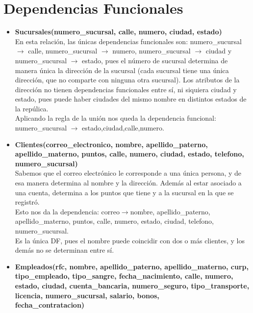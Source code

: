 \documentclass[11pt]{article}
\begin{document}
\section*{Dependencias Funcionales}
\begin{itemize}

\item \textbf{Sucursales(numero\_sucursal, calle, numero, ciudad, estado)}\\
En esta relación, las únicas dependencias funcionales son:
numero\_sucursal $\rightarrow$ calle, numero\_sucursal $\rightarrow$ numero, numero\_sucursal $\rightarrow$ ciudad y  numero\_sucursal $\rightarrow$ estado, pues el número de sucursal determina de manera única la dirección de la sucursal (cada sucursal tiene una única dirección, que no comparte con ninguna otra sucursal). Los atributos de la dirección no tienen dependencias funcionales entre sí, ni siquiera ciudad y estado, pues puede haber ciudades del mismo nombre en distintos estados de la repúlica.\\
Aplicando la regla de la unión nos queda la dependencia funcional: numero\_sucursal $\rightarrow$ estado,ciudad,calle,numero.
\item \textbf{Clientes(correo\_electronico, nombre, apellido\_paterno, apellido\_materno, puntos, calle, numero, ciudad, estado, telefono, numero\_sucursal)}\\
Sabemos que el correo electrónico le corresponde a una única persona, y de esa manera determina al nombre y la dirección. Además al estar asociado a una cuenta, determina a los puntos que tiene y a la sucursal en la que se registró.\\
Esto nos da la dependencia: correo$\rightarrow$nombre, apellido\_paterno, apellido\_materno, puntos, calle, numero, estado, ciudad, telefono, numero\_sucursal.\\
Es la única DF, pues el nombre puede coincidir con dos o más clientes, y los demás no se determinan entre sí. 
\item \textbf{Empleados(rfc, nombre, apellido\_paterno, apellido\_materno, curp,  tipo\_empleado, tipo\_sangre, fecha\_nacimiento, calle, numero, estado, ciudad, cuenta\_bancaria, numero\_seguro, tipo\_transporte, licencia, numero\_sucursal, salario, bonos, \\ fecha\_contratacion)}\\

\end{itemize}
\end{document}
